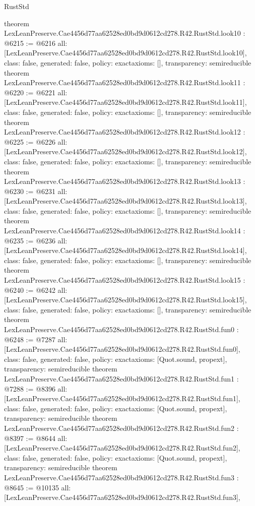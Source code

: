 \begin{lexlean}{RustStd}
\begin{coremodule}
{}
theorem LexLeanPreserve.Cae4456d77aa62528ed0bd9d0612cd278.R42.RustStd.look10 : @6215 := @6216 {
  all: [LexLeanPreserve.Cae4456d77aa62528ed0bd9d0612cd278.R42.RustStd.look10],
  class: false,
  generated: false,
  policy: exact{axioms: []},
  transparency: semireducible
}
theorem LexLeanPreserve.Cae4456d77aa62528ed0bd9d0612cd278.R42.RustStd.look11 : @6220 := @6221 {
  all: [LexLeanPreserve.Cae4456d77aa62528ed0bd9d0612cd278.R42.RustStd.look11],
  class: false,
  generated: false,
  policy: exact{axioms: []},
  transparency: semireducible
}
theorem LexLeanPreserve.Cae4456d77aa62528ed0bd9d0612cd278.R42.RustStd.look12 : @6225 := @6226 {
  all: [LexLeanPreserve.Cae4456d77aa62528ed0bd9d0612cd278.R42.RustStd.look12],
  class: false,
  generated: false,
  policy: exact{axioms: []},
  transparency: semireducible
}
theorem LexLeanPreserve.Cae4456d77aa62528ed0bd9d0612cd278.R42.RustStd.look13 : @6230 := @6231 {
  all: [LexLeanPreserve.Cae4456d77aa62528ed0bd9d0612cd278.R42.RustStd.look13],
  class: false,
  generated: false,
  policy: exact{axioms: []},
  transparency: semireducible
}
theorem LexLeanPreserve.Cae4456d77aa62528ed0bd9d0612cd278.R42.RustStd.look14 : @6235 := @6236 {
  all: [LexLeanPreserve.Cae4456d77aa62528ed0bd9d0612cd278.R42.RustStd.look14],
  class: false,
  generated: false,
  policy: exact{axioms: []},
  transparency: semireducible
}
theorem LexLeanPreserve.Cae4456d77aa62528ed0bd9d0612cd278.R42.RustStd.look15 : @6240 := @6242 {
  all: [LexLeanPreserve.Cae4456d77aa62528ed0bd9d0612cd278.R42.RustStd.look15],
  class: false,
  generated: false,
  policy: exact{axioms: []},
  transparency: semireducible
}
theorem LexLeanPreserve.Cae4456d77aa62528ed0bd9d0612cd278.R42.RustStd.fun0 : @6248 := @7287 {
  all: [LexLeanPreserve.Cae4456d77aa62528ed0bd9d0612cd278.R42.RustStd.fun0],
  class: false,
  generated: false,
  policy: exact{axioms: [Quot.sound, propext]},
  transparency: semireducible
}
theorem LexLeanPreserve.Cae4456d77aa62528ed0bd9d0612cd278.R42.RustStd.fun1 : @7288 := @8396 {
  all: [LexLeanPreserve.Cae4456d77aa62528ed0bd9d0612cd278.R42.RustStd.fun1],
  class: false,
  generated: false,
  policy: exact{axioms: [Quot.sound, propext]},
  transparency: semireducible
}
theorem LexLeanPreserve.Cae4456d77aa62528ed0bd9d0612cd278.R42.RustStd.fun2 : @8397 := @8644 {
  all: [LexLeanPreserve.Cae4456d77aa62528ed0bd9d0612cd278.R42.RustStd.fun2],
  class: false,
  generated: false,
  policy: exact{axioms: [Quot.sound, propext]},
  transparency: semireducible
}
theorem LexLeanPreserve.Cae4456d77aa62528ed0bd9d0612cd278.R42.RustStd.fun3 : @8645 := @10135 {
  all: [LexLeanPreserve.Cae4456d77aa62528ed0bd9d0612cd278.R42.RustStd.fun3],
}
\end{coremodule}
\end{lexlean}
